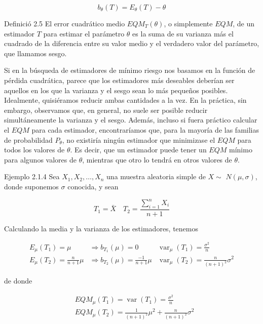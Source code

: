 \documentclass[
]{article}
\begin{document}
\[
b_{\theta}(T)=E_{\theta}(T)-\theta
\]

Definició 2.5 El error cuadrático medio \(E Q M_{T}(\theta)\), o simplemente \(E Q M\), de un estimador \(T\) para estimar el parámetro \(\theta\) es la suma de su varianza más el cuadrado de la diferencia entre su valor medio y el verdadero valor del parámetro, que llamamos sesgo.

Si en la búsqueda de estimadores de mínimo riesgo nos basamos en la función de pérdida cuadrática, parece que los estimadores más deseables deberían ser aquellos en los que la varianza y el sesgo sean lo más pequeños posibles. Idealmente, quisiéramos reducir ambas cantidades a la vez. En la práctica, sin embargo, observamos que, en general, no suele ser posible reducir simultáneamente la varianza y el sesgo. Además, incluso si fuera práctico calcular el \(E Q M\) para cada estimador, encontraríamos que, para la mayoría de las familias de probabilidad \(P_{\theta}\), no existiría ningún estimador que minimizase el \(E Q M\) para todos los valores de \(\theta\). Es decir, que un estimador puede tener un \(E Q M\) mínimo para algunos valores de \(\theta\), mientras que otro lo tendrá en otros valores de \(\theta\).

Ejemplo 2.1.4 Sea \(X_{1}, X_{2}, \ldots, X_{n}\) una muestra aleatoria simple de \(X \sim\) \(N(\mu, \sigma)\), donde suponemos \(\sigma\) conocida, y sean

\[
T_{1}=\bar{X} \quad T_{2}=\frac{\sum_{i=1}^{n} X_{i}}{n+1}
\]

Calculando la media y la varianza de los estimadores, tenemos

\[
\begin{array}{lll}
E_{\mu}\left(T_{1}\right)=\mu & \Rightarrow b_{T_{1}}(\mu)=0 & \operatorname{var}_{\mu}\left(T_{1}\right)=\frac{\sigma^{2}}{n} \\
E_{\mu}\left(T_{2}\right)=\frac{n}{n+1} \mu & \Rightarrow b_{T_{2}}(\mu)=\frac{-1}{n+1} \mu & \operatorname{var}_{\mu}\left(T_{2}\right)=\frac{n}{(n+1)^{2}} \sigma^{2}
\end{array}
\]

de donde

\[
\begin{aligned}
& E Q M_{\mu}\left(T_{1}\right)=\operatorname{var}\left(T_{1}\right)=\frac{\sigma^{2}}{n} \\
& E Q M_{\mu}\left(T_{2}\right)=\frac{1}{(n+1)^{2}} \mu^{2}+\frac{n}{(n+1)^{2}} \sigma^{2}
\end{aligned}
\]
\end{document}

